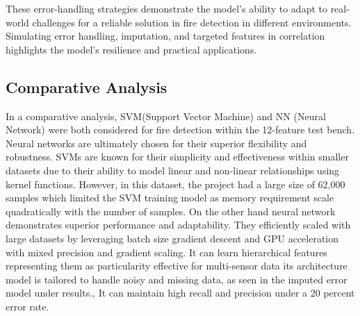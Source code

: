 \documentclass[conference]{IEEEtran}
\begin{document}
These error-handling strategies demonstrate the model's ability to adapt to real-world challenges for a reliable solution in fire detection in different environments. Simulating error handling, imputation, and targeted features in correlation highlights the model's resilience and practical applications. 

\subsection{Comparative Analysis}
In a comparative analysis, SVM(Support Vector Machine) and NN (Neural Network) were both considered for fire detection within the 12-feature test bench. Neural networks are ultimately chosen for their superior flexibility and robustness. SVMs are known for their simplicity and effectiveness within smaller datasets due to their ability to model linear and non-linear relationships using kernel functions. However, in this dataset, the project had a large size of 62,000 samples which limited the SVM training model as memory requirement scale quadratically with the number of samples. On the other hand neural network demonstrates superior performance and adaptability. They efficiently scaled with large datasets by leveraging batch size gradient descent and GPU acceleration with mixed precision and gradient scaling. It can learn hierarchical features representing them as particularity effective for multi-sensor data its architecture model is tailored to handle noisy and missing data, as seen in the imputed error model under results., It can maintain high recall and precision under a 20 percent error rate. 
\end{document}

